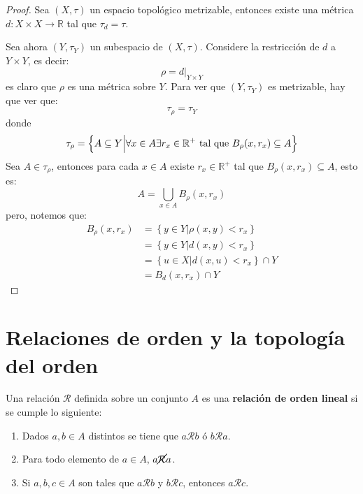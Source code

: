 \documentclass[12pt]{report}
\theoremstyle{largebreak}
\newcommand\cf[3]{\ensuremath{#1:#2\rightarrow#3}}
\begin{document}
    \begin{proof}
        Sea $(X,\tau)$ un espacio topológico metrizable, entonces existe una métrica $\cf{d}{X\times X}{\mathbb{R}}$ tal que $\tau_d=\tau$.

        Sea ahora $(Y,\tau_Y)$ un subespacio de $(X,\tau)$. Considere la restricción de $d$ a $Y\times Y$, es decir:
        \begin{equation*}
            \rho=d\Big|_{Y\times Y}
        \end{equation*}
        es claro que $\rho$ es una métrica sobre $Y$. Para ver que $(Y,\tau_Y)$ es metrizable, hay que ver que:
        \begin{equation*}
            \tau_\rho=\tau_Y
        \end{equation*}
        donde
        \begin{equation*}
            \tau_\rho=\left\{A\subseteq Y\Big|\forall x\in A\exists r_x\in\mathbb{R}^+\textup{ tal que }B_\rho(x,r_x)\subseteq A \right\}
        \end{equation*}
        Sea $A\in\tau_\rho$, entonces para cada $x\in A$ existe $r_x\in\mathbb{R}^+$ tal que $B_\rho(x,r_x)\subseteq A$, esto es:
        \begin{equation*}
            A=\bigcup_{x\in A}B_\rho(x,r_x)
        \end{equation*}
        pero, notemos que:
        \begin{equation*}
            \begin{split}
                B_\rho(x,r_x)&=\left\{y\in Y\Big|\rho(x,y)<r_x \right\}\\
                &=\left\{y\in Y\Big|d(x,y)<r_x \right\}\\
                &=\left\{u\in X\Big|d(x,u)<r_x \right\}\cap Y \\
                &= B_d(x,r_x)\cap Y
            \end{split}
        \end{equation*}
    \end{proof}

    \section{Relaciones de orden y la topología del orden}

    \begin{mydef}
        Una relación $\mathcal{R}$ definida sobre un conjunto $A$ es una \textbf{relación de orden lineal} si se cumple lo siguiente:
        \begin{enumerate}
            \item Dados $a,b\in A$ distintos se tiene que $a\mathcal{R}b$ ó $b\mathcal{R}a$.
            \item Para todo elemento de $a\in A$, $a\cancel{\mathcal{R}}a$.
            \item Si $a,b,c\in A$ son tales que $a\mathcal{R}b$ y $b\mathcal{R}c$, entonces $a\mathcal{R}c$.
        \end{enumerate}
    \end{mydef}
\end{document}
